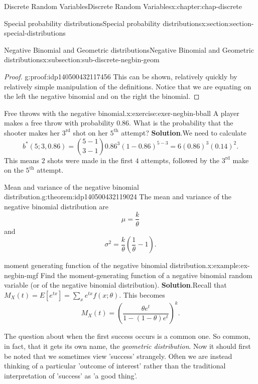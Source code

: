 \documentclass[oneside,10pt,]{book}
\newcommand{\blocktitlefont}{\relax}
\begin{document}
\begin{chapterptx}{Discrete Random Variables}{}{Discrete Random Variables}{}{}{x:chapter:chap-discrete}
\begin{sectionptx}{Special probability distributions}{}{Special probability distributions}{}{}{x:section:section-special-distributions}
\begin{subsectionptx}{Negative Binomial and Geometric distributions}{}{Negative Binomial and Geometric distributions}{}{}{x:subsection:sub-discrete-negbin-geom}
\begin{proof}{}{g:proof:idp140500432117456}
This can be shown, relatively quickly by relatively simple manipulation of the definitions. Notice that we are equating on the left the negative binomial and on the right the binomial.%
\end{proof}
\begin{inlineexercise}{Free throws with the negative binomial.}{x:exercise:exer-negbin-bball}%
A player makes a free throw with probability \(0.86\). What is the probability that the shooter makes her \(3^{\text{rd}}\) shot on her \(5^{\text{th}}\) attempt?%
\textbf{\blocktitlefont Solution}.\quad{}We need to calculate%
\begin{equation*}
b^*(5; 3, 0.86) =
{5-1\choose3-1}0.86^3(1-0.86)^{5-3}
= 6(0.86)^3(0.14)^2\text{.}
\end{equation*}
This means \(2\) shots were made in the first \(4\) attempts, followed by the \(3^{\text{rd}}\) make on the \(5^{\text{th}}\) attempt.%
\end{inlineexercise}
\begin{theorem}{Mean and variance of the negative binomial distribution.}{}{g:theorem:idp140500432119024}%
The mean and variance of the negative binomial distribution are%
\begin{equation*}
\mu
= \frac{k}{\theta}
\end{equation*}
and%
\begin{equation*}
\sigma^2 =
\frac{k}{\theta}\left(\frac{1}{\theta}-1\right)\text{.}
\end{equation*}
%
\end{theorem}
\begin{example}{moment generating function of the negative binomial distribution.}{x:example:ex-negbin-mgf}%
Find the moment-generating function of a negative binomial random variable (or of the negative binomial distribution).%
\textbf{\blocktitlefont Solution}.\quad{}Recall that \(\displaystyle M_X(t) = E[e^{tx}] = \sum_x e^{tx} f(x;
\theta)\). This becomes%
\begin{equation*}
M_X(t) = \left(\dfrac{\theta e^t}{1-(1-\theta)e^t}\right)^k\text{.}
\end{equation*}
%
\end{example}
The question about when the first success occurs is a common one. So common, in fact, that it gets its own name, the \emph{geometric distribution}.  Now it should first be noted that we sometimes view 'success' strangely. Often we are instead thinking of a particular 'outcome of interest' rather than the traditional interpretation of 'success' as 'a good thing'.%

\end{subsectionptx}
\end{sectionptx}
\end{chapterptx}
\end{document}
